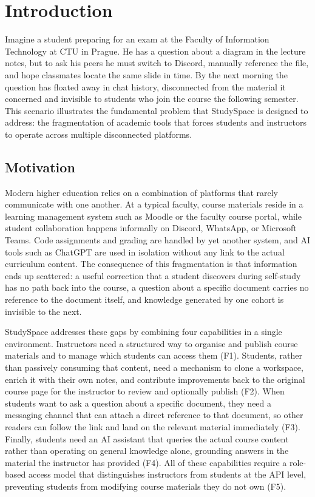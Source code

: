 \chapter{Introduction}
\label{ch:introduction}

Imagine a student preparing for an exam at the Faculty of Information Technology at CTU in Prague.
He has a question about a diagram in the lecture notes, but to ask his peers he must switch to
Discord, manually reference the file, and hope classmates locate the same slide in time. By the
next morning the question has floated away in chat history, disconnected from the material it
concerned and invisible to students who join the course the following semester. This scenario
illustrates the fundamental problem that StudySpace is designed to address: the fragmentation of
academic tools that forces students and instructors to operate across multiple disconnected platforms.


\section{Motivation}
\label{sec:motivation}

Modern higher education relies on a combination of platforms that rarely communicate with one
another. At a typical faculty, course materials reside in a learning management system such as Moodle
or the faculty course portal, while student collaboration happens informally on Discord, WhatsApp, or
Microsoft Teams. Code assignments and grading are handled by yet another system, and AI tools such
as ChatGPT are used in isolation without any link to the actual curriculum content. The consequence
of this fragmentation is that information ends up scattered: a useful correction that a student
discovers during self-study has no path back into the course, a question about a specific document
carries no reference to the document itself, and knowledge generated by one cohort is invisible to
the next.

StudySpace addresses these gaps by combining four capabilities in a single environment. Instructors
need a structured way to organise and publish course materials and to manage which students can
access them (F1). Students, rather than passively consuming that content, need a mechanism to clone
a workspace, enrich it with their own notes, and contribute improvements back to the original course
page for the instructor to review and optionally publish (F2). When students want to ask a question
about a specific document, they need a messaging channel that can attach a direct reference to that
document, so other readers can follow the link and land on the relevant material immediately (F3).
Finally, students need an AI assistant that queries the actual course content rather than operating
on general knowledge alone, grounding answers in the material the instructor has provided (F4). All
of these capabilities require a role-based access model that distinguishes instructors from students
at the API level, preventing students from modifying course materials they do not own (F5).

